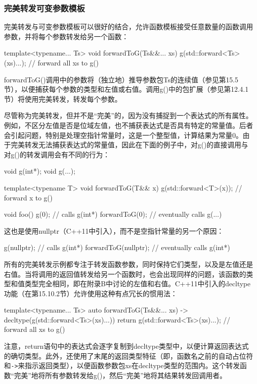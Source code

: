 \subsubsection{完美转发可变参数模板}

完美转发与可变参数模板可以很好的结合，允许函数模板接受任意数量的函数调用参数，并将每个参数转发给另一个函数：

\begin{cpp}
template<typename... Ts> void forwardToG(Ts&&... xs) {
	g(std::forward<Ts>(xs)...); // forward all xs to g()
}
\end{cpp}

forwardToG()调用中的参数将（独立地）推导参数包Ts的连续值（参见第15.5节），以便捕获每个参数的类型和左值或右值。调用g()中的包扩展（参见第12.4.1节）将使用完美转发，转发每个参数。

尽管称为完美转发，但并不是“完美”的，因为没有捕捉到一个表达式的所有属性。例如，不区分左值是否是位域左值，也不捕获表达式是否具有特定的常量值。后者会引起问题，特别是处理空指针常量时，这是一个整型值，计算结果为常量0。由于完美转发无法捕获表达式的常量值，因此在下面的例子中，对g()的直接调用与对g()的转发调用会有不同的行为：

\begin{cpp}
void g(int*);
void g(...);

template<typename T> void forwardToG(T&& x) {
	g(std::forward<T>(x)); // forward x to g()
}

void foo() {
	g(0); // calls g(int*)
	forwardToG(0); // eventually calls g(...)
}
\end{cpp}

这也是使用nullptr（C++11中引入），而不是空指针常量的另一个原因：

\begin{cpp}
g(nullptr); // calls g(int*)
forwardToG(nullptr); // eventually calls g(int*)
\end{cpp}

所有的完美转发示例都专注于转发函数参数，同时保持它们类型，以及是左值还是右值。当将调用的返回值转发给另一个函数时，也会出现同样的问题，该函数的类型和值类型完全相同，即在附录B中讨论的左值和右值。C++11中引入的decltype功能（在第15.10.2节）允许使用这种有点冗长的惯用法：

\begin{cpp}
template<typename... Ts>
auto forwardToG(Ts&&... xs) -> decltype(g(std::forward<Ts>(xs)...)) {
	return g(std::forward<Ts>(xs)...); // forward all xs to g()
}
\end{cpp}

注意，return语句中的表达式会逐字复制到decltype类型中，以便计算返回表达式的确切类型。此外，还使用了末尾的返回类型特征（即，函数名之前的自动占位符和\texttt{->}来指示返回类型），以便函数参数包xs在decltype类型的范围内。这个转发函数“完美”地将所有参数转发给g()，然后“完美”地将其结果转发回调用者。

